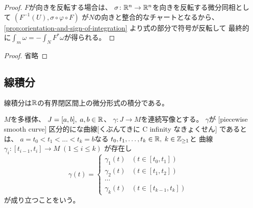 \documentclass[report]{jlreq}
\begin{document}
\begin{proof}
    $F$が向きを反転する場合は、
    $\sigma \colon \mathbb{R}^n \to \mathbb{R}^n$を向きを反転する微分同相として
    $(F^{-1}(U), \sigma \circ \varphi \circ F)$
    が$N$の向きと整合的なチャートとなるから、
    \cref{prop:orientation-and-sign-of-integration}
    より式の部分で符号が反転して
    最終的に$\int_m \omega = - \int_N F^* \omega$が得られる。
\end{proof}


\begin{proof}
    省略
\end{proof}

\begin{example}[積分計算の例]
\end{example}

\subsection{線積分}

線積分は$\mathbb{R}$の有界閉区間上の微分形式の積分である。

\begin{definition}[線積分]
\end{definition}

\begin{definition}
    $M$を多様体、
    $J = [a, b], \; a, b \in \mathbb{R}$、
    $\gamma \colon J \to M$を連続写像とする。
    $\gamma$が
    [piecewise smooth curve]
    {区分的に{\smooth}な曲線}[くぶんてきに C infinity なきょくせん]
    であるとは、
    $a = t_0 < t_1 < \dots < t_k = b$なる
    $t_0, t_1, \dots, t_k \in \mathbb{R}, \; k \in \mathbb{Z}_{\ge 1}$と
    {\smooth}曲線$\gamma_i \colon [t_{i-1}, t_i] \to M \; (1 \le i \le k)$
    が存在し
    \begin{equation}
        \gamma(t) = \begin{cases}
            \gamma_1(t) & (t \in [t_0, t_1]) \\
            \gamma_2(t) & (t \in [t_1, t_2]) \\
            \cdots \\
            \gamma_k(t) & (t \in [t_{k-1}, t_k])
        \end{cases}
    \end{equation}
    が成り立つことをいう。
\end{definition}
\end{document}
